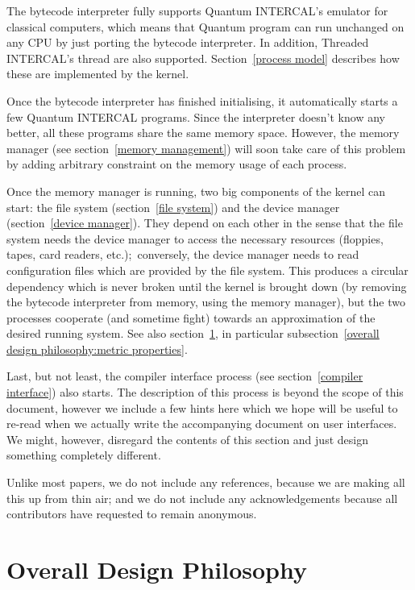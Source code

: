 \documentclass[12pt,titlepage,a4paper,twoside]{article}
\begin{document}
The bytecode interpreter fully supports Quantum INTERCAL's emulator for
classical computers, which means that Quantum program can run unchanged on
any CPU by just porting the bytecode interpreter. In addition, Threaded
INTERCAL's thread are also supported.
Section~\ref{process model} describes how these are implemented by the kernel.

Once the bytecode interpreter has finished initialising, it automatically
starts a few Quantum INTERCAL programs. Since the interpreter doesn't know
any better, all these programs share the same memory space. However, the
memory manager (see section~\ref{memory management}) will soon take care
of this problem by adding arbitrary constraint on the memory usage of each
process.

Once the memory manager is running, two big components of the kernel can
start: the file system (section~\ref{file system}) and the device manager
(section~\ref{device manager}). They depend on each other in the sense
that the file system needs the device manager to access the necessary
resources (floppies, tapes, card readers, etc.);\ conversely, the device
manager needs to read configuration files which are provided by the file
system. This produces a circular dependency which is never broken until
the kernel is brought down (by removing the bytecode interpreter from
memory, using the memory manager), but the two processes cooperate (and
sometime fight) towards an approximation of the desired running system.
See also section~\ref{overall design philosophy}, in particular
subsection~\ref{overall design philosophy:metric properties}.

Last, but not least, the compiler interface process (see
section~\ref{compiler interface}) also starts. The description of this
process is beyond the scope of this document, however we include a few
hints here which we hope will be useful to re-read when we actually
write the accompanying document on user interfaces. We might, however,
disregard the contents of this section and just design something completely
different.

Unlike most papers, we do not include any references, because we are making
all this up from thin air; and we do not include any acknowledgements because
all contributors have requested to remain anonymous.


\section{Overall Design Philosophy}
\label{overall design philosophy}
\end{document}
